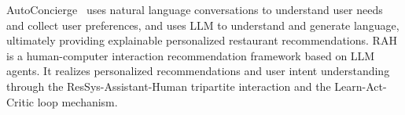 AutoConcierge~\cite{zeng2024automated} uses natural language conversations to understand user needs and collect user preferences, and uses LLM to understand and generate language, ultimately providing explainable personalized restaurant recommendations.
RAH~\cite{shu2024rah} is a human-computer interaction recommendation framework based on LLM agents. 
It realizes personalized recommendations and user intent understanding through the ResSys-Assistant-Human tripartite interaction and the Learn-Act-Critic loop mechanism.


\begin{table*}[t]
\end{table*}
